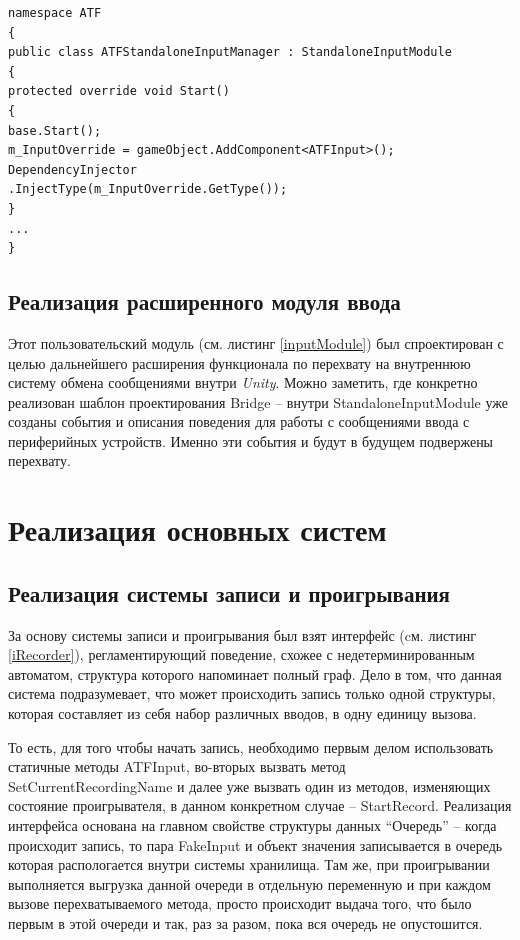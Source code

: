 \begin{lstlisting}[caption={Пользовательский модуль ввода для ATFInput},label=inputModule]
namespace ATF
{
public class ATFStandaloneInputManager : StandaloneInputModule
{
protected override void Start()
{
base.Start();
m_InputOverride = gameObject.AddComponent<ATFInput>();
DependencyInjector
.InjectType(m_InputOverride.GetType());
}
...
}
\end{lstlisting}

\subsection{Реализация расширенного модуля ввода}
Этот пользовательский модуль (см. листинг \ref{inputModule}) был спроектирован с целью дальнейшего расширения функционала по перехвату на внутреннюю систему обмена сообщениями внутри \textit{Unity}. Можно заметить, где конкретно реализован шаблон проектирования Bridge -- внутри StandaloneInputModule уже созданы события и описания поведения для работы с сообщениями ввода с периферийных устройств. Именно эти события и будут в будущем подвержены перехвату.

\section{Реализация основных систем}
\subsection{Реализация системы записи и проигрывания}
За основу системы записи и проигрывания был взят интерфейс (cм. листинг \ref{iRecorder}), регламентирующий поведение, схожее с недетерминированным автоматом, структура которого напоминает полный граф. Дело в том, что данная система подразумевает, что может происходить запись только одной структуры, которая составляет из себя набор различных вводов, в одну единицу вызова.

То есть, для того чтобы начать запись, необходимо первым делом использовать статичные методы ATFInput, во-вторых вызвать метод SetCurrentRecordingName и далее уже вызвать один из методов, изменяющих состояние проигрывателя, в данном конкретном случае -- StartRecord. Реализация интерфейса основана на главном свойстве структуры данных ``Очередь'' -- когда происходит запись, то пара FakeInput и объект значения записывается в очередь которая распологается внутри системы хранилища. Там же, при проигрывании выполняется выгрузка данной очереди в отдельную переменную и при каждом вызове перехватываемого метода, просто происходит выдача того, что было первым в этой очереди и так, раз за разом, пока вся очередь не опустошится.

